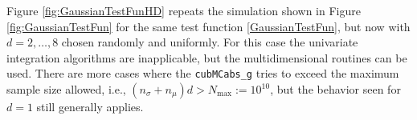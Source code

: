 \documentclass{iitthesis}
\theoremstyle{definition}
\begin{document}
Figure \ref{fig:GaussianTestFunHD} repeats the simulation shown in Figure \ref{fig:GaussianTestFun} for the same test function \eqref{GaussianTestFun}, but now with $d=2, \ldots, 8$ chosen randomly and uniformly.  For this case the univariate integration algorithms are inapplicable, but the multidimensional routines can be used. There are more cases where the {\tt cubMCabs\_g} tries to exceed the maximum sample size allowed, i.e., $(n_{\sigma}+n_\mu)d > N_{\max}:=10^{10}$, but the behavior seen for $d=1$ still generally applies.  


%
\end{document}
